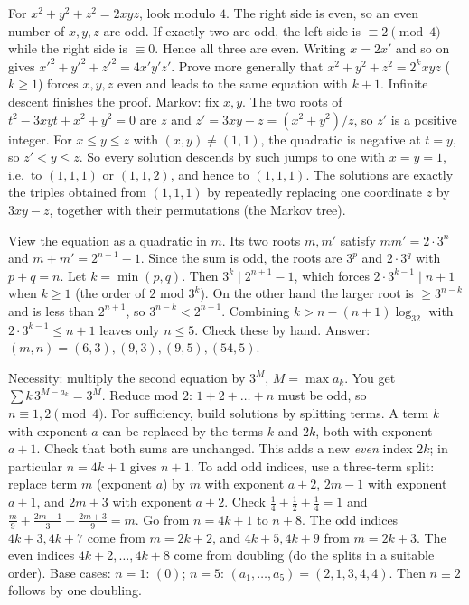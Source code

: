 \documentclass[11pt,a4paper]{article}
\begin{document}

 For $x^2+y^2+z^2=2xyz$, look modulo $4$. The right side is even, so an even number of $x,y,z$ are odd. If exactly two are odd, the left side is $\equiv2\pmod4$ while the right side is $\equiv0$. Hence all three are even.
 Writing $x=2x'$ and so on gives $x'^2+y'^2+z'^2=4x'y'z'$. Prove more generally that $x^2+y^2+z^2=2^kxyz$ ($k\ge1$) forces $x,y,z$ even and leads to the same equation with $k+1$. Infinite descent finishes the proof.
 Markov: fix $x,y$. The two roots of $t^2-3xyt+x^2+y^2=0$ are $z$ and $z'=3xy-z=(x^2+y^2)/z$, so $z'$ is a positive integer. For $x\le y\le z$ with $(x,y)\ne(1,1)$, the quadratic is negative at $t=y$, so $z'<y\le z$.
 So every solution descends by such jumps to one with $x=y=1$, i.e.\ to $(1,1,1)$ or $(1,1,2)$, and hence to $(1,1,1)$. The solutions are exactly the triples obtained from $(1,1,1)$ by repeatedly replacing one coordinate $z$ by $3xy-z$, together with their permutations (the Markov tree).

 View the equation as a quadratic in $m$. Its two roots $m,m'$ satisfy $mm'=2\cdot3^n$ and $m+m'=2^{n+1}-1$. Since the sum is odd, the roots are $3^p$ and $2\cdot3^q$ with $p+q=n$.
 Let $k=\min(p,q)$. Then $3^k\mid2^{n+1}-1$, which forces $2\cdot3^{k-1}\mid n+1$ when $k\ge1$ (the order of $2$ mod $3^k$). On the other hand the larger root is $\ge3^{n-k}$ and is less than $2^{n+1}$, so $3^{n-k}<2^{n+1}$.
 Combining $k>n-(n+1)\log_32$ with $2\cdot3^{k-1}\le n+1$ leaves only $n\le5$. Check these by hand. Answer: $(m,n)=(6,3),(9,3),(9,5),(54,5)$.

 Necessity: multiply the second equation by $3^M$, $M=\max a_k$. You get $\sum k\,3^{M-a_k}=3^M$. Reduce mod $2$: $1+2+\dots+n$ must be odd, so $n\equiv1,2\pmod4$.
 For sufficiency, build solutions by splitting terms. A term $k$ with exponent $a$ can be replaced by the terms $k$ and $2k$, both with exponent $a+1$. Check that both sums are unchanged. This adds a new \emph{even} index $2k$; in particular $n=4k+1$ gives $n+1$.
 To add odd indices, use a three-term split: replace term $m$ (exponent $a$) by $m$ with exponent $a+2$, $2m-1$ with exponent $a+1$, and $2m+3$ with exponent $a+2$. Check $\frac14+\frac12+\frac14=1$ and $\frac m9+\frac{2m-1}3+\frac{2m+3}9=m$.
 Go from $n=4k+1$ to $n+8$. The odd indices $4k+3,4k+7$ come from $m=2k+2$, and $4k+5,4k+9$ from $m=2k+3$. The even indices $4k+2,\dots,4k+8$ come from doubling (do the splits in a suitable order). Base cases: $n=1$: $(0)$; $n=5$: $(a_1,\dots,a_5)=(2,1,3,4,4)$. Then $n\equiv2$ follows by one doubling.
\end{document}
